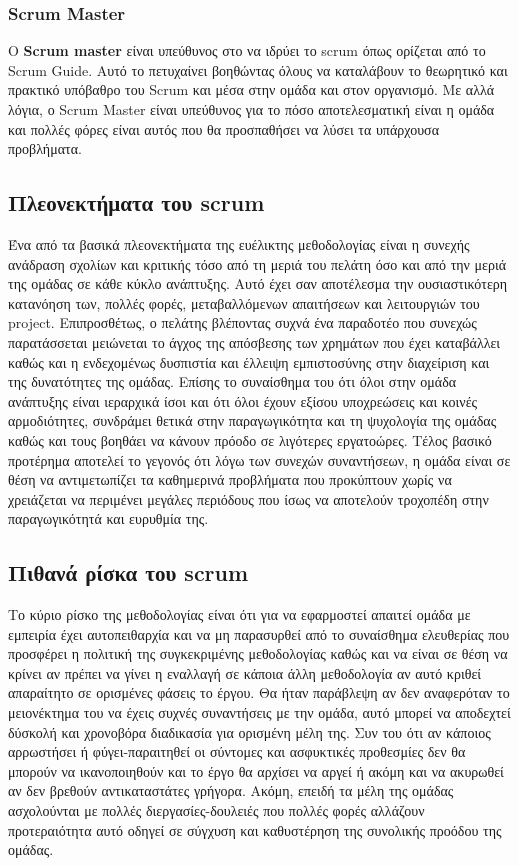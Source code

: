 \subsubsection{Scrum Master}

Ο \textbf{Scrum master} είναι υπεύθυνος στο να ιδρύει το scrum όπως ορίζεται από το Scrum Guide.
Αυτό το πετυχαίνει βοηθώντας όλους να καταλάβουν το θεωρητικό και πρακτικό υπόβαθρο του Scrum και μέσα στην ομάδα και στον οργανισμό.
Με αλλά λόγια, ο Scrum Master είναι υπεύθυνος για το πόσο αποτελεσματική είναι η ομάδα και πολλές φόρες είναι αυτός που θα προσπαθήσει να λύσει τα υπάρχουσα προβλήματα.

\subsection{Πλεονεκτήματα του scrum}

Ένα από τα βασικά πλεονεκτήματα της ευέλικτης μεθοδολογίας είναι η συνεχής ανάδραση σχολίων και κριτικής τόσο από τη μεριά του πελάτη όσο και από την μεριά της ομάδας σε κάθε κύκλο ανάπτυξης.
Αυτό έχει σαν αποτέλεσμα την ουσιαστικότερη κατανόηση των, πολλές φορές, μεταβαλλόμενων απαιτήσεων και λειτουργιών του project.
Επιπροσθέτως, ο πελάτης βλέποντας συχνά ένα παραδοτέο που συνεχώς παρατάσσεται μειώνεται το άγχος της απόσβεσης των χρημάτων που έχει καταβάλλει καθώς και η ενδεχομένως δυσπιστία και έλλειψη εμπιστοσύνης στην διαχείριση και της δυνατότητες της ομάδας.
Επίσης το συναίσθημα του ότι όλοι στην ομάδα ανάπτυξης είναι ιεραρχικά ίσοι και ότι όλοι έχουν εξίσου υποχρεώσεις και κοινές αρμοδιότητες, συνδράμει θετικά στην παραγωγικότητα και τη ψυχολογία της ομάδας καθώς και τους βοηθάει να κάνουν πρόοδο σε λιγότερες εργατοώρες.
Τέλος βασικό προτέρημα αποτελεί το γεγονός ότι λόγω των συνεχών συναντήσεων, η ομάδα είναι σε θέση να αντιμετωπίζει τα καθημερινά προβλήματα που προκύπτουν χωρίς να χρειάζεται να περιμένει μεγάλες περιόδους που ίσως να αποτελούν τροχοπέδη στην παραγωγικότητά και ευρυθμία της.

\subsection{Πιθανά ρίσκα του scrum}

Το κύριο ρίσκο της μεθοδολογίας είναι ότι για να εφαρμοστεί απαιτεί ομάδα με εμπειρία έχει αυτοπειθαρχία και να μη παρασυρθεί από το συναίσθημα ελευθερίας που προσφέρει η πολιτική της συγκεκριμένης μεθοδολογίας καθώς και να είναι σε θέση να κρίνει αν πρέπει να γίνει η εναλλαγή σε κάποια άλλη μεθοδολογία αν αυτό κριθεί απαραίτητο σε ορισμένες φάσεις το έργου.
Θα ήταν παράβλεψη αν δεν  αναφερόταν το μειονέκτημα του να έχεις συχνές συναντήσεις με την ομάδα, αυτό μπορεί να αποδεχτεί δύσκολή και χρονοβόρα διαδικασία για ορισμένη μέλη της.
Συν του ότι αν κάποιος αρρωστήσει ή φύγει-παραιτηθεί οι σύντομες και ασφυκτικές προθεσμίες δεν θα μπορούν να ικανοποιηθούν και το έργο θα αρχίσει να αργεί ή ακόμη και να ακυρωθεί αν δεν βρεθούν αντικαταστάτες γρήγορα.
Ακόμη, επειδή τα μέλη της ομάδας ασχολούνται με πολλές διεργασίες-δουλειές που πολλές φορές αλλάζουν προτεραιότητα αυτό οδηγεί σε  σύγχυση και καθυστέρηση της συνολικής προόδου της ομάδας.
